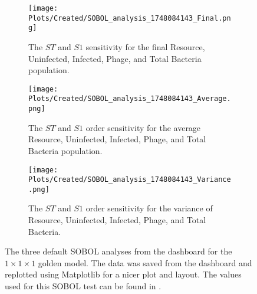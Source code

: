 \begin{figure}
    \centering
    \begin{subfigure}{0.32\linewidth}
        \centering
        \captionsetup{width=1\linewidth}
        \texttt{[image: Plots/Created/SOBOL\_analysis\_1748084143\_Final.png]}
        \caption{
            The $ST$ and $S1$ sensitivity for the final Resource, Uninfected, Infected, Phage, and Total Bacteria population. 
        }
        \label{fig:created:SOBOL_final}
    \end{subfigure}
    \hfill
    \begin{subfigure}{0.32\linewidth}
        \centering
        \captionsetup{width=1\linewidth}
        \texttt{[image: Plots/Created/SOBOL\_analysis\_1748084143\_Average.png]}
        \caption{
            The $ST$ and $S1$ order sensitivity for the average Resource, Uninfected, Infected, Phage, and Total Bacteria population. 
        }
        \label{fig:created:SOBOL_average}
    \end{subfigure}
    \hfill
    \begin{subfigure}{0.32\linewidth}
        \centering
        \captionsetup{width=1\linewidth}
        \texttt{[image: Plots/Created/SOBOL\_analysis\_1748084143\_Variance.png]}
        \caption{
            The $ST$ and $S1$ order sensitivity for the variance of Resource, Uninfected, Infected, Phage, and Total Bacteria. 
        }
        \label{fig:created:SOBOL_variance}
    \end{subfigure}
    \caption{
        The three default SOBOL analyses from the dashboard for the $1\times 1 \times 1$ golden model. 
        The data was saved from the dashboard and replotted using Matplotlib for a nicer plot and layout. 
        The values used for this SOBOL test can be found in . 
        }
    \label{fig:created:SOBOL_default}
\end{figure}

